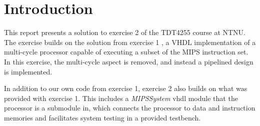 \chapter{Introduction}
This report presents a solution to exercise 2 of the TDT4255 course at NTNU.
The exercise builds on the solution from exercise 1 \cite{bib:ex1-report},
a VHDL implementation of a multi-cycle processor capable of executing a subset of the MIPS instruction set.
In this exercise, the multi-cycle aspect is removed,
and instead a pipelined design is implemented.

In addition to our own code from exercise 1,
exercise 2 also builds on what was provided with exercise 1.
This includes a \textit{MIPSSystem} \gls{vhdl} module that the processor is a submodule in,
which connects the processor to data and instruction memories and facilitates system testing in a provided testbench.





